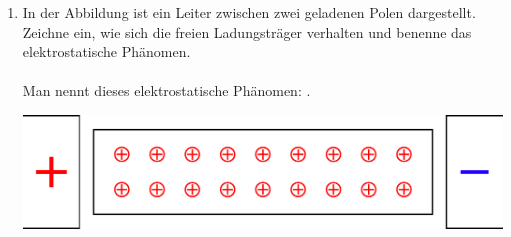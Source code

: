 \documentclass[task=1]{exercise}
\begin{document}
  \begin{enumerate}
  \item In der Abbildung ist ein Leiter zwischen zwei geladenen Polen dargestellt. Zeichne ein, wie sich die freien Ladungsträger verhalten und benenne das elektrostatische Phänomen.\\~\\
  Man nennt dieses elektrostatische Phänomen: \luecke{4cm}.
  \begin{center}
    \vspace{.5cm}
    \includegraphics[width=.5\textwidth]{images/influenceSimple.pdf}
    \vspace{.5cm}
  \end{center}
  


\end{enumerate}
\end{document}
